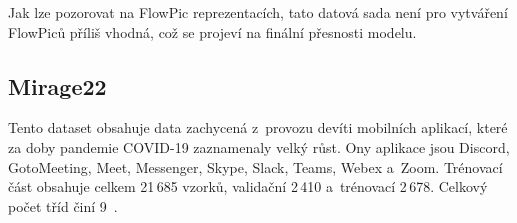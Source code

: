 Jak lze pozorovat na FlowPic reprezentacích, tato datová sada není pro vytváření FlowPiců příliš vhodná, což se projeví na finální přesnosti modelu.

\subsection{Mirage22}
Tento dataset obsahuje data zachycená z~provozu devíti mobilních aplikací, které za doby pandemie COVID-19 zaznamenaly velký růst. Ony aplikace jsou Discord, GotoMeeting, Meet, Messenger, Skype, Slack, Teams, Webex a~Zoom. Trénovací část obsahuje celkem 21\,685 vzorků, validační 2\,410 a~trénovací 2\,678. Celkový počet tříd činí 9~\cite{mirage22}.

\begin{table}[H]
    \centering
    \caption{Analýza datové sady Mirage22 s~filtrem >10pkts.}
    \label{mirage22_filter_10}
\end{table}

\begin{table}[H]
    \centering
    \caption{Analýza datové sady Mirage22 s~filtrem >1\,000pkts.}
    \label{mirage22_filter_1000}
\end{table}

